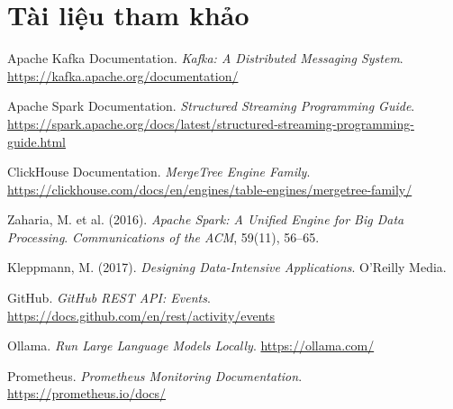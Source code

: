 \documentclass[12pt,a4paper]{article}
\begin{document}
\section*{Tài liệu tham khảo}

\begin{enumerate}[leftmargin=2em,label={[\arabic*]}]
  \item Apache Kafka Documentation. \textit{Kafka: A Distributed Messaging System}.
        \url{https://kafka.apache.org/documentation/}

  \item Apache Spark Documentation. \textit{Structured Streaming Programming Guide}.
        \url{https://spark.apache.org/docs/latest/structured-streaming-programming-guide.html}

  \item ClickHouse Documentation. \textit{MergeTree Engine Family}.
        \url{https://clickhouse.com/docs/en/engines/table-engines/mergetree-family/}

  \item Zaharia, M. et al. (2016). \textit{Apache Spark: A Unified Engine for Big Data Processing}.
        \textit{Communications of the ACM}, 59(11), 56--65.

  \item Kleppmann, M. (2017). \textit{Designing Data-Intensive Applications}.
        O'Reilly Media.

  \item GitHub. \textit{GitHub REST API: Events}.
        \url{https://docs.github.com/en/rest/activity/events}

  \item Ollama. \textit{Run Large Language Models Locally}.
        \url{https://ollama.com/}

  \item Prometheus. \textit{Prometheus Monitoring Documentation}.
        \url{https://prometheus.io/docs/}
\end{enumerate}
\end{document}
